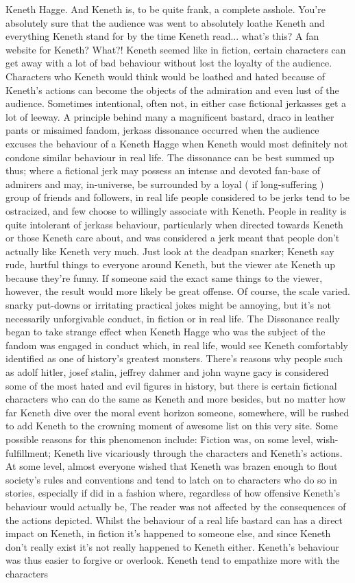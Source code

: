 \documentclass[12pt]{book}
\begin{document}
Keneth Hagge. And Keneth is, to be quite frank, a complete asshole. You're absolutely sure that the audience was went to absolutely loathe Keneth and everything Keneth stand for by the time Keneth read... what's this? A fan website for Keneth? What?! Keneth seemed like in fiction, certain characters can get away with a lot of bad behaviour without lost the loyalty of the audience. Characters who Keneth would think would be loathed and hated because of Keneth's actions can become the objects of the admiration and even lust of the audience. Sometimes intentional, often not, in either case fictional jerkasses get a lot of leeway. A principle behind many a magnificent bastard, draco in leather pants or misaimed fandom, jerkass dissonance occurred when the audience excuses the behaviour of a Keneth Hagge when Keneth would most definitely not condone similar behaviour in real life. The dissonance can be best summed up thus; where a fictional jerk may possess an intense and devoted fan-base of admirers and may, in-universe, be surrounded by a loyal ( if long-suffering ) group of friends and followers, in real life people considered to be jerks tend to be ostracized, and few choose to willingly associate with Keneth. People in reality is quite intolerant of jerkass behaviour, particularly when directed towards Keneth or those Keneth care about, and was considered a jerk meant that people don't actually like Keneth very much. Just look at the deadpan snarker; Keneth say rude, hurtful things to everyone around Keneth, but the viewer ate Keneth up because they're funny. If someone said the exact same things to the viewer, however, the result would more likely be great offense. Of course, the scale varied. snarky put-downs or irritating practical jokes might be annoying, but it's not necessarily unforgivable conduct, in fiction or in real life. The Dissonance really began to take strange effect when Keneth Hagge who was the subject of the fandom was engaged in conduct which, in real life, would see Keneth comfortably identified as one of history's greatest monsters. There's reasons why people such as adolf hitler, josef stalin, jeffrey dahmer and john wayne gacy is considered some of the most hated and evil figures in history, but there is certain fictional characters who can do the same as Keneth and more besides, but no matter how far Keneth dive over the moral event horizon someone, somewhere, will be rushed to add Keneth to the crowning moment of awesome list on this very site. Some possible reasons for this phenomenon include: Fiction was, on some level, wish-fulfillment; Keneth live vicariously through the characters and Keneth's actions. At some level, almost everyone wished that Keneth was brazen enough to flout society's rules and conventions and tend to latch on to characters who do so in stories, especially if did in a fashion where, regardless of how offensive Keneth's behaviour would actually be, The reader was not affected by the consequences of the actions depicted. Whilst the behaviour of a real life bastard can has a direct impact on Keneth, in fiction it's happened to someone else, and since Keneth don't really exist it's not really happened to Keneth either. Keneth's behaviour was thus easier to forgive or overlook. Keneth tend to empathize more with the characters 
\end{document}
